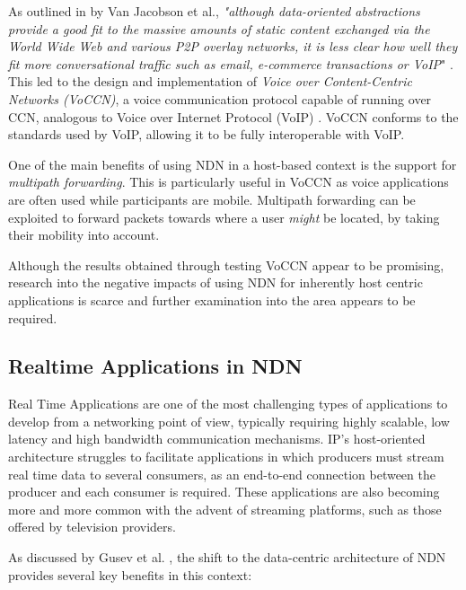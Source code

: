 As outlined in by Van Jacobson et al., \textit{"although data-oriented abstractions provide a good fit to the massive amounts of static content exchanged via the World Wide Web and various P2P overlay networks, it is less clear how well they fit more conversational traffic such as email, e-commerce transactions or VoIP}" \cite{vj-voccn}. This led to the design and implementation of \textit{Voice over Content-Centric Networks (VoCCN)}, a voice communication protocol capable of running over CCN, analogous to Voice over Internet Protocol (VoIP) \cite{voip}. VoCCN conforms to the standards used by VoIP, allowing it to be fully interoperable with VoIP. 

One of the main benefits of using NDN in a host-based context is the support for \textit{multipath forwarding}. This is particularly useful in VoCCN as voice applications are often used while participants are mobile. Multipath forwarding can be exploited to forward packets towards where a user \textit{might} be located, by taking their mobility into account.

Although the results obtained through testing VoCCN appear to be promising, research into the negative impacts of using NDN for inherently host centric applications is scarce and further examination into the area appears to be required.


\subsection{Realtime Applications in NDN}
Real Time Applications are one of the most challenging types of applications to develop from a networking point of view, typically requiring highly scalable, low latency and high bandwidth communication mechanisms. IP's host-oriented architecture struggles to facilitate applications in which producers must stream real time data to several consumers, as an end-to-end connection between the producer and each consumer is required. These applications are also becoming more and more common with the advent of streaming platforms, such as those offered by television providers.

As discussed by Gusev et al. \cite{realtime-streaming-data}, the shift to the data-centric architecture of NDN provides several key benefits in this context:

